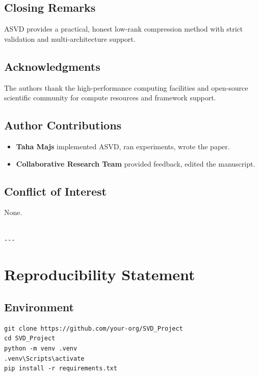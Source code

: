 \subsection{Closing Remarks}

ASVD provides a practical, honest low-rank compression method with strict 
validation and multi-architecture support.

\subsection{Acknowledgments}

The authors thank the high-performance computing facilities and open-source scientific community for compute resources and framework support.

\subsection{Author Contributions}

\begin{itemize}
\item \textbf{Taha Majs} implemented ASVD, ran experiments, wrote the paper.
\item \textbf{Collaborative Research Team} provided feedback, edited the manuscript.

\end{itemize}
\subsection{Conflict of Interest}

None.
\begin{lstlisting}

---
\end{lstlisting}


\section{Reproducibility Statement}

\subsection{Environment}

\begin{lstlisting}
git clone https://github.com/your-org/SVD_Project
cd SVD_Project
python -m venv .venv
.venv\Scripts\activate
pip install -r requirements.txt
\end{lstlisting}

